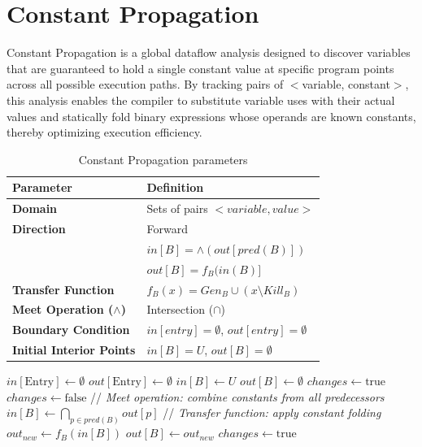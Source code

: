 \section{Constant Propagation}

Constant Propagation is a global dataflow analysis designed to discover variables that are guaranteed to hold a single
constant value at specific program points across all possible execution paths. By tracking pairs of $<$variable, constant$>$, 
this analysis enables the compiler to substitute variable uses with their actual values and statically fold 
binary expressions whose operands are known constants, thereby optimizing execution efficiency.

\begin{table}[H]
\centering
\renewcommand{\arraystretch}{1.5}
\begin{tabular}{ll}
\toprule
\textbf{Parameter} & \textbf{Definition} \\
\midrule
\textbf{Domain} & Sets of pairs $<variable, value>$\\
\textbf{Direction} & Forward \\ & $in[B] = \wedge(out[pred(B)])$ \\ & $out[B] = f_B(in(B)]$ \\
\textbf{Transfer Function} & $f_B(x) = Gen_B \cup (x \setminus Kill_B)$ \\
\textbf{Meet Operation ($\wedge$)} & Intersection ($\cap$) \\
\textbf{Boundary Condition} & $in[entry] = \emptyset$, $out[entry] = \emptyset$ \\
\textbf{Initial Interior Points} & $in[B] = U$, $out[B] = \emptyset$ \\
\bottomrule
\end{tabular}
\caption{Constant Propagation parameters}
\end{table}

\begin{algorithm}[H]
\caption{Constant Propagation}
\begin{algorithmic}[1]
\State $in[\text{Entry}] \gets \emptyset$
\State $out[\text{Entry}] \gets \emptyset$
\Statex
{}
    \State $in[B] \gets U$
    \State $out[B] \gets \emptyset$
\EndFor
\Statex
\State $changes \gets \text{true}$
    \State $changes \gets \text{false}$
        \State // \textit{Meet operation: combine constants from all predecessors}
        \State $in[B] \gets \bigcap_{p \in pred(B)} out[p]$
        \Statex
        \State // \textit{Transfer function: apply constant folding}
        \State $out_{new} \gets f_B(in[B])$
        \Statex
            \State $out[B] \gets out_{new}$
            \State $changes \gets \text{true}$
        \EndIf
    \EndFor
\EndWhile
\end{algorithmic}
\end{algorithm}

